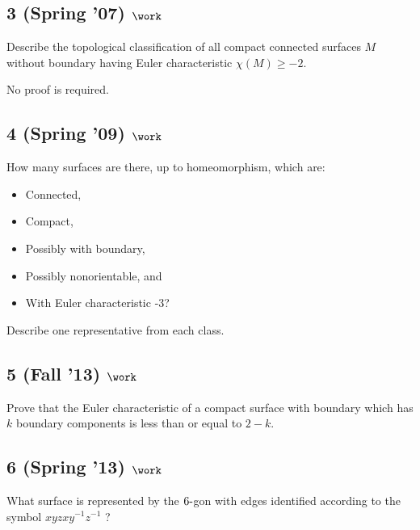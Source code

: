\hypertarget{spring-07-work-3}{%
\subsection{\texorpdfstring{3 (Spring '07)
\(\work\)}{3 (Spring '07) \textbackslash work}}\label{spring-07-work-3}}

Describe the topological classification of all compact connected
surfaces \(M\) without boundary having Euler characteristic
\(\chi(M )\geq -2\).

No proof is required.

\hypertarget{spring-09-work-6}{%
\subsection{\texorpdfstring{4 (Spring '09)
\(\work\)}{4 (Spring '09) \textbackslash work}}\label{spring-09-work-6}}

How many surfaces are there, up to homeomorphism, which are:

\begin{itemize}
\tightlist
\item
  Connected,
\item
  Compact,
\item
  Possibly with boundary,
\item
  Possibly nonorientable, and
\item
  With Euler characteristic -3?
\end{itemize}

Describe one representative from each class.

\hypertarget{fall-13-work}{%
\subsection{\texorpdfstring{5 (Fall '13)
\(\work\)}{5 (Fall '13) \textbackslash work}}\label{fall-13-work}}

Prove that the Euler characteristic of a compact surface with boundary
which has \(k\) boundary components is less than or equal to \(2 - k\).

\hypertarget{spring-13-work-4}{%
\subsection{\texorpdfstring{6 (Spring '13)
\(\work\)}{6 (Spring '13) \textbackslash work}}\label{spring-13-work-4}}

What surface is represented by the \(6{\hbox{-}}\)gon with edges
identified according to the symbol \(xyzxy^{-1}z^{-1}\) ?

